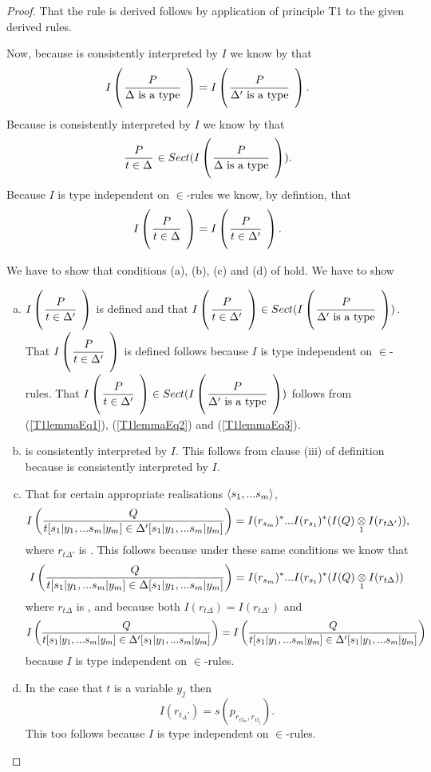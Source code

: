 \begin{proof}
That the rule  is derived follows by application of principle T1 to the given derived rules.

Now, because  is consistently interpreted by $I$ we know by  that
\begin{equation}
\label{T1lemmaEq1}
\Imap{\gatdisplayrule{P}{\isT{\Delta}}} = \Imap{\gatdisplayrule{P}{\isT{\Delta'}}}.
\end{equation}
Because  is consistently interpreted by $I$ we know by  that
\begin{equation}
\label{T1lemmaEq2}
\gatdisplayrule{P}{\ofT{t}{\Delta}} \in Sect(\Imap{\gatdisplayrule{P}{\isT{\Delta}}}).
\end{equation}
Because $I$ is type independent on $\in$-rules we know, by defintion,  that
\begin{equation}
\label{T1lemmaEq3}
\Imap{\gatdisplayrule{P}{\ofT{t}{\Delta}}} = \Imap{\gatdisplayrule{P}{\ofT{t}{\Delta'}}}.
\end{equation}

We have to show that conditions (a), (b), (c) and (d) of  hold. We have to show
\begin{enumerate}[(a)]
\item $\Imap{\gatdisplayrule{P}{\ofT{t}{\Delta'}}}$ is defined
and that $\Imap{\gatdisplayrule{P}{\ofT{t}{\Delta'}}} \in Sect(\Imap{\gatdisplayrule{P}{\isT{\Delta'}}})$.
That  $\Imap{\gatdisplayrule{P}{\ofT{t}{\Delta'}}}$ is defined follows because
$I$ is type independent on $\in$-rules.
 That $\Imap{\gatdisplayrule{P}{\ofT{t}{\Delta'}}} \in Sect(\Imap{\gatdisplayrule{P}{\isT{\Delta'}}})$
  follows from (\ref{T1lemmaEq1}), (\ref{T1lemmaEq2}) and (\ref{T1lemmaEq3}).\\
\item
{} is consistently interpreted by $I$. This  follows from clause (iii) of
definition  because  is consistently interpreted by $I$.

\item
That for certain appropriate realisations $\tuple{\sm}$,
$$ \Imappedrule{Q}{\ofT{t[\SUBsFORy{m}]}{\Delta'[\SUBsFORy{m}]}} = I(r_{s_m})^*...I(r_{s_1})^*(\crossx{I(Q)}{I(r_{t\Delta'})}{1}),$$
where  $r_{t\Delta'}$ is .
This follows because under these same conditions we know that
$$ \Imappedrule{Q}{\ofT{t[\SUBsFORy{m}]}{\Delta[\SUBsFORy{m}]}} = I(r_{s_m})^*...I(r_{s_1})^*(\crossx{I(Q)}{I(r_{t\Delta})}{1})$$
where  $r_{t\Delta}$ is ,
and because both $I(r_{t\Delta})=I(r_{t\Delta'})$ and 
$$\Imappedrule{Q}{\ofT{t[\SUBsFORy{m}]}{\Delta'[\SUBsFORy{m}]}} = \Imappedrule{Q}{\ofT{t[\SUBsFORy{m}]}{\Delta'[\SUBsFORy{m}]}}$$
because $I$ is type independent on $\in$-rules.
\item
In the case that $t$ is a variable $y_j$ then
$$I(r_{t_\Delta'})=s(p_{r_{\Omega_m},r_{\Omega_j}}).$$ This too follows because $I$ is type independent on $\in$-rules.
\end{enumerate}
\end{proof}

